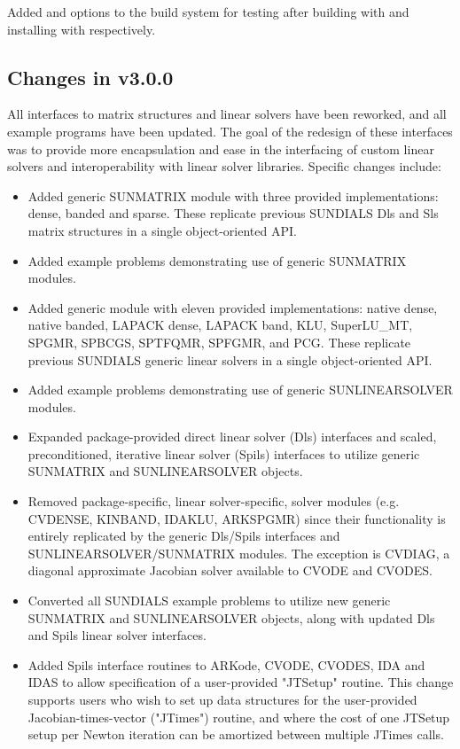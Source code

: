 Added  and  options to the build
system for testing {\sundials} after building with  and
installing with  respectively.

\subsection*{Changes in v3.0.0}

All interfaces to matrix structures and linear solvers
have been reworked, and all example programs have been updated.
The goal of the redesign of these interfaces was to provide more encapsulation
and ease in the interfacing of custom linear solvers and interoperability
with linear solver libraries.
Specific changes include:
\begin{itemize}
\item Added generic SUNMATRIX module with three provided implementations:
        dense, banded and sparse.  These replicate previous SUNDIALS Dls and
        Sls matrix structures in a single object-oriented API.
\item Added example problems demonstrating use of generic SUNMATRIX modules.
\item Added generic  module with eleven provided
        implementations: {\sundials} native dense, {\sundials} native banded,
        LAPACK dense, LAPACK band, KLU,
        SuperLU\_MT, SPGMR, SPBCGS, SPTFQMR, SPFGMR, and PCG.  These replicate
        previous SUNDIALS generic linear solvers in a single object-oriented
        API.
\item Added example problems demonstrating use of generic SUNLINEARSOLVER
        modules.
\item Expanded package-provided direct linear solver (Dls) interfaces and
        scaled, preconditioned, iterative linear solver (Spils) interfaces
        to utilize generic SUNMATRIX and SUNLINEARSOLVER objects.
\item Removed package-specific, linear solver-specific, solver modules
        (e.g. CVDENSE, KINBAND, IDAKLU, ARKSPGMR) since their functionality
        is entirely replicated by the generic Dls/Spils interfaces and
        SUNLINEARSOLVER/SUNMATRIX modules.  The exception is CVDIAG, a
        diagonal approximate Jacobian solver available to CVODE and CVODES.
\item Converted all SUNDIALS example problems to utilize new generic
        SUNMATRIX and SUNLINEARSOLVER objects, along with updated Dls and
        Spils linear solver interfaces.
\item Added Spils interface routines to ARKode, CVODE, CVODES, IDA and
        IDAS to allow specification of a user-provided "JTSetup" routine.
        This change supports users who wish to set up data structures for
        the user-provided Jacobian-times-vector ("JTimes") routine, and
        where the cost of one JTSetup setup per Newton iteration can be
        amortized between multiple JTimes calls.
\end{itemize}


